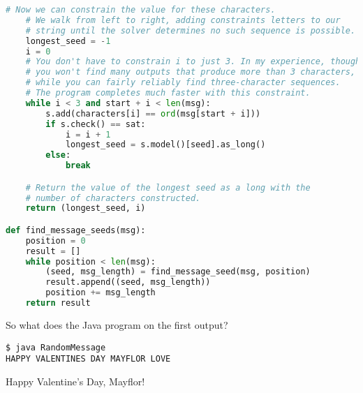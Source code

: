 \documentclass[12pt]{article}
\begin{document}
\begin{lstlisting}[language=Python]
    # Now we can constrain the value for these characters.
    # We walk from left to right, adding constraints letters to our
    # string until the solver determines no such sequence is possible.    
    longest_seed = -1
    i = 0
    # You don't have to constrain i to just 3. In my experience, though,
    # you won't find many outputs that produce more than 3 characters,
    # while you can fairly reliably find three-character sequences.
    # The program completes much faster with this constraint.
    while i < 3 and start + i < len(msg):
        s.add(characters[i] == ord(msg[start + i]))
        if s.check() == sat:
            i = i + 1
            longest_seed = s.model()[seed].as_long()
        else:
            break

    # Return the value of the longest seed as a long with the
    # number of characters constructed.
    return (longest_seed, i)

def find_message_seeds(msg):
    position = 0
    result = []
    while position < len(msg):
        (seed, msg_length) = find_message_seed(msg, position)
        result.append((seed, msg_length))
        position += msg_length
    return result
\end{lstlisting}

So what does the Java program on the first output?

\begin{lstlisting}
$ java RandomMessage
HAPPY VALENTINES DAY MAYFLOR LOVE
\end{lstlisting}

Happy Valentine's Day, Mayflor!
\end{document}
